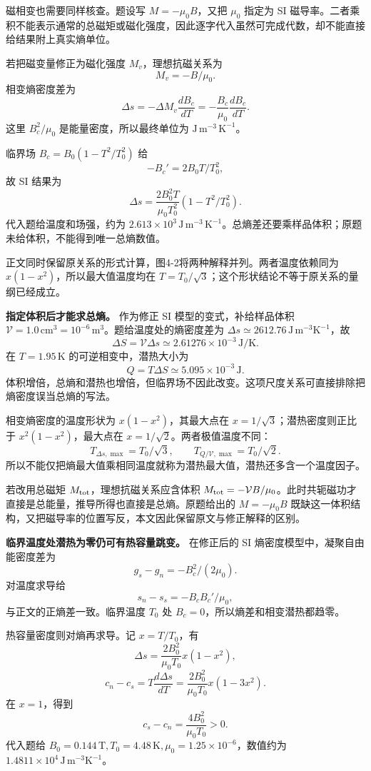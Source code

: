 \documentclass[12pt,a4paper,UTF8]{ctexart}
\begin{document}
磁相变也需要同样核查。题设写 \(M=-\mu_0B\)，又把 \(\mu_0\) 指定为 SI
磁导率。二者乘积不能表示通常的总磁矩或磁化强度，因此逐字代入虽然可完成代数，却不能直接给结果附上真实熵单位。

若把磁变量修正为磁化强度 \(M_v\)，理想抗磁关系为 \[
M_v=-B/\mu_0.
\] 相变熵密度差为 \[
\Delta s=-\Delta M_v\frac{dB_c}{dT}
=-\frac{B_c}{\mu_0}\frac{dB_c}{dT}.
\] 这里 \(B_c^2/\mu_0\) 是能量密度，所以最终单位为
\(\mathrm{J\,m^{-3}\,K^{-1}}\)。

临界场 \(B_c=B_0(1-T^2/T_0^2)\) 给 \[
-B_c'=2B_0T/T_0^2,
\] 故 SI 结果为 \[
\Delta s=\frac{2B_0^2T}{\mu_0T_0^2}(1-T^2/T_0^2).
\] 代入题给温度和场强，约为
\(2.613\times10^3\,\mathrm{J\,m^{-3}\,K^{-1}}\)。总熵差还要乘样品体积；原题未给体积，不能得到唯一总熵数值。

正文同时保留原关系的形式计算，图4-2将两种解释并列。两者温度依赖同为
\(x(1-x^2)\)，所以最大值温度均在
\(T=T_0/\sqrt3\)；这个形状结论不等于原关系的量纲已经成立。

\textbf{指定体积后才能求总熵。} 作为修正 SI 模型的变式，补给样品体积
\(\mathcal V=1.0\,\mathrm{cm^3}=10^{-6}\,\mathrm{m^3}\)。题给温度处的熵密度差为
\(\Delta s\simeq2612.76\,\mathrm{J\,m^{-3}K^{-1}}\)，故 \[
\Delta S=\mathcal V\Delta s\simeq2.61276\times10^{-3}\,\mathrm{J/K}.
\] 在 \(T=1.95\,\mathrm K\) 的可逆相变中，潜热大小为 \[
Q=T\Delta S\simeq5.095\times10^{-3}\,\mathrm J.
\]
体积增倍，总熵和潜热也增倍，但临界场不因此改变。这项尺度关系可直接排除把熵密度误当总熵的写法。

相变熵密度的温度形状为 \(x(1-x^2)\)，其最大点在
\(x=1/\sqrt3\)；潜热密度则正比于 \(x^2(1-x^2)\)，最大点在
\(x=1/\sqrt2\)。两者极值温度不同： \[
T_{\Delta s,\max}=T_0/\sqrt3,\qquad
T_{Q/\mathcal V,\max}=T_0/\sqrt2.
\]
所以不能仅把熵最大值乘相同温度就称为潜热最大值，潜热还多含一个温度因子。

若改用总磁矩 \(M_{\rm tot}\)，理想抗磁关系应含体积
\(M_{\rm tot}=-\mathcal V B/\mu_0\)。此时共轭磁功才直接是总能量，推导所得也直接是总熵。原题给出的
\(M=-\mu_0B\)
既缺这一体积结构，又把磁导率的位置写反，本文因此保留原文与修正解释的区别。

\textbf{临界温度处潜热为零仍可有热容量跳变。} 在修正后的 SI
熵密度模型中，凝聚自由能密度差为 \[
g_s-g_n=-B_c^2/(2\mu_0).
\] 对温度求导给 \[
s_n-s_s=-B_cB_c'/\mu_0,
\] 与正文的正熵差一致。临界温度 \(T_0\) 处
\(B_c=0\)，所以熵差和相变潜热都趋零。

热容量密度则对熵再求导。记 \(x=T/T_0\)，有 \[
\Delta s=\frac{2B_0^2}{\mu_0T_0}x(1-x^2),
\] \[
c_n-c_s=T\frac{d\Delta s}{dT}
=\frac{2B_0^2}{\mu_0T_0}x(1-3x^2).
\] 在 \(x=1\)，得到 \[
c_s-c_n=\frac{4B_0^2}{\mu_0T_0}>0.
\] 代入题给
\(B_0=0.144\,\mathrm T,T_0=4.48\,\mathrm K,\mu_0=1.25\times10^{-6}\)，数值约为
\(1.4811\times10^4\,\mathrm{J\,m^{-3}K^{-1}}\)。
\end{document}
